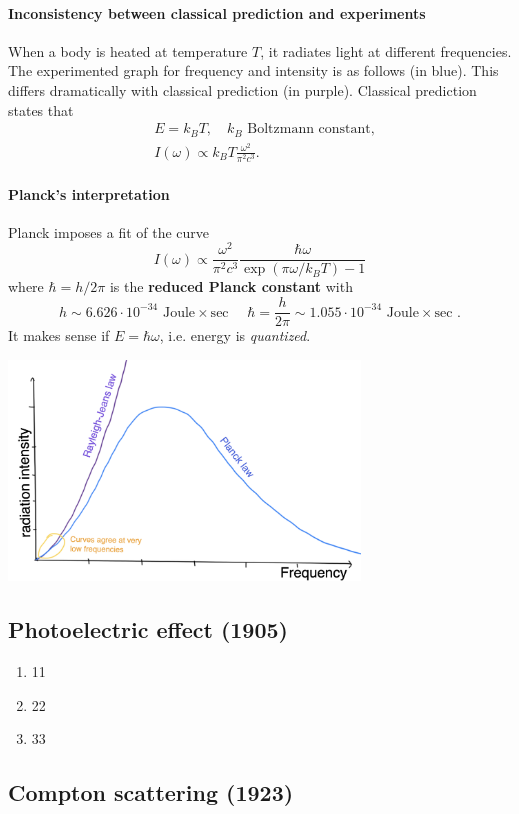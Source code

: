 \documentclass[a4paper]{article}
\begin{document}
\paragraph{Inconsistency between classical prediction and experiments}
When a body is heated at temperature $T$, it radiates light at different frequencies. The experimented graph for frequency and intensity is as follows (in blue). This differs dramatically with classical prediction (in purple). Classical prediction states that 
\begin{align*}
    &E = k_B T, \quad k_B \text{ Boltzmann constant},\\ 
    &I(\omega) \propto k_B T \frac{\omega^2}{\pi^2 c^3}. 
\end{align*}
\paragraph{Planck's interpretation}
Planck imposes a fit of the curve 
\[
    I(\omega) \propto \frac{\omega^2}{\pi^2c^3} \frac{\hbar \omega}{\exp(\pi \omega/k_B T)-1}
\]
where $ \hbar = h/2\pi $ is the \textbf{reduced Planck constant} with 
\[
    h \sim 6.626 \cdot 10^{-34} \text { Joule} \times \text {sec } \quad \hbar=\frac{h}{2 \pi} \sim 1.055 \cdot 10^{-34} \text { Joule} \times \text {sec }. 
\]
It makes sense if $ E = \hbar \omega $, i.e. energy is \textit{quantized}.
\begin{center}
    \includegraphics[width=0.7\textwidth]{qm1.png}
\end{center}

\subsection{Photoelectric effect (1905)}

\begin{enumerate}
    \item 11
    \item 22
    \item 33
\end{enumerate}
\subsection{Compton scattering (1923)}
\end{document}
